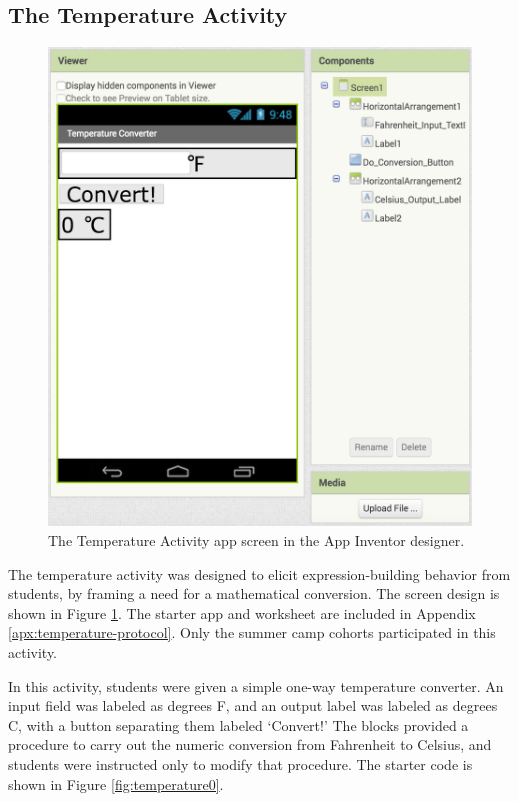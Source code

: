 \subsection{The Temperature Activity}

\begin{figure}
  \centering
      \includegraphics[width=\textwidth]{images/temperatureActivity/temperature-designer}
  \caption[The Temperature Activity app designer view]{The Temperature Activity app screen in the App Inventor designer.}
  \label{fig:temperature-screen}
\end{figure}

The temperature activity was designed to elicit expression-building behavior from students, by framing a need for a mathematical conversion. The screen design is shown in Figure \ref{fig:temperature-screen}. The starter app and worksheet are included in Appendix \ref{apx:temperature-protocol}. Only the summer camp cohorts participated in this activity. 

In this activity, students were given a simple one-way temperature converter. An input field was labeled as degrees F, and an output label was labeled as degrees C, with a button separating them labeled `Convert!' The blocks provided a procedure to carry out the numeric conversion from Fahrenheit to Celsius, and students were instructed only to modify that procedure. The starter code is shown in Figure \ref{fig:temperature0}.


